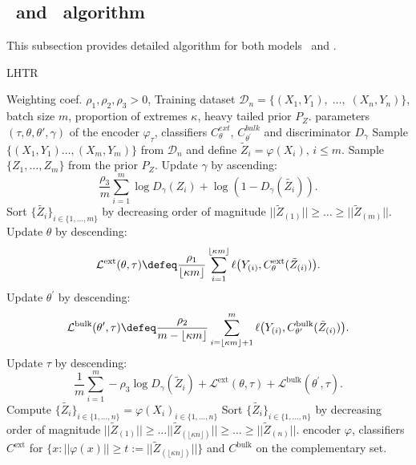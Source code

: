 \subsection{\HTalgo\ and \geneliex\ algorithm}\label{sec:code} This subsection provides detailed algorithm for both models \HTalgo\ and \geneliex.
\begin{algorithm}[t]
\caption{LHTR}
\begin{algorithmic}\INPUT  Weighting coef. $\rho_1, \rho_2, \rho_3>0$, Training dataset $\mathcal{D}_n=\{(X_1,Y_1),\; \ldots,\; (X_n,Y_n)\}$, batch size $m$, proportion of extremes $\kappa$, heavy tailed prior $P_Z$. 
\Initialize parameters $(\tau, \theta,\theta', \gamma)$ of the encoder $\varphi_\tau$, classifiers $C_\theta^{ext}$, $C_{\theta^\prime}^{bulk}$ and  discriminator $D_\gamma$
\Optimization
{}
\Statex Sample $\{(X_1, Y_1) \ldots, (X_m, Y_m)\}$ from $\mathcal{D}_n$ 
and define $\tilde Z_i = \varphi(X_i), \, i\le m$. 
\Statex Sample $\{Z_1, \ldots, Z_m\}$ from the prior $P_Z$.
\Statex Update $\gamma$ by ascending:\\\Statex 
 $$ \frac{\rho_3}{m}\sum_{i=1}^m \log D_\gamma(Z_i) + \log(1 - D_\gamma(\tilde{Z_i})).$$
\Statex Sort $\{\tilde{Z_i}\}_{i \in \{1,\ldots, m\}}$ by decreasing order of magnitude $||\tilde{Z}_{(1)}||\geq \ldots \geq ||\tilde{Z}_{(m)}||.$
\Statex Update $\theta$ by descending:\\\Statex 
$$ \mathcal{L}^\text{ext} (\theta,\tau) \defeq \frac{\rho_1}{\lfloor\kappa m\rfloor}\sum_{i=1}^{\lfloor{\kappa m}\rfloor} \ell\big(Y_{(i)} ,  C^\text{ext}_\theta(\tilde{Z}_{(i)})\big).$$\Statex Update $\theta^\prime$ by descending:\\\Statex
$$\mathcal{L}^\text{bulk}(\theta^\prime,\tau) \defeq \frac{\rho_2}{m - \lfloor{\kappa m}\rfloor}\sum_{i=\lfloor{\kappa m}\rfloor+1}^m \ell\big( Y_{(i)} ,  C_{\theta^\prime}^\text{bulk}(\tilde{Z}_{(i)})\big).$$\Statex
\Statex Update $\tau$ by descending: 
\Statex
$$ \frac{1}{m}\sum_{i=1}^m - \rho_3 \log D_\gamma(\tilde{Z}_{i})
+ \mathcal{L}^\text{ext}(\theta,\tau) + \mathcal{L}^\text{bulk}(\theta^\prime,\tau).
$$
\EndWhile
\Statex Compute $\{\tilde{Z_i}\}_{i \in \{1,\ldots, n\}} = {\varphi(X_i)}_{i \in \{1,\ldots, n\}}$
\Statex Sort $\{\tilde{Z_i}\}_{i \in \{1,\ldots, n\}}$ by decreasing order of magnitude $||\tilde{Z}_{(1)}||\geq \ldots ||\tilde{Z}_{(\lfloor{\kappa n}\rfloor)}||\geq \ldots \geq ||\tilde{Z}_{(n)}||.$
\OUTPUT encoder $\varphi$, classifiers $C^\text{ext}$ for $\{x : ||\varphi(x)|| \geq  t:=||\tilde{Z}_{(\lfloor{\kappa n}\rfloor)}||  \}$ and $C^\text{bulk}$ on the complementary set.

\end{algorithmic}
\end{algorithm}
